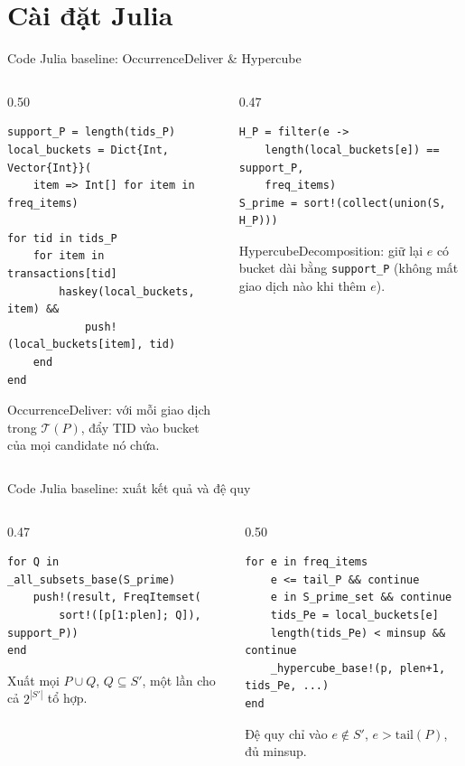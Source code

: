 \documentclass[9pt, aspectratio=169]{beamer}
\begin{document}
\section{Cài đặt Julia}

\begin{frame}[fragile]{Code Julia baseline: OccurrenceDeliver \& Hypercube}
  \begin{columns}[T,onlytextwidth]
    \begin{column}{0.50\textwidth}
\begin{lstlisting}
support_P = length(tids_P)
local_buckets = Dict{Int, Vector{Int}}(
    item => Int[] for item in freq_items)

for tid in tids_P
    for item in transactions[tid]
        haskey(local_buckets, item) &&
            push!(local_buckets[item], tid)
    end
end
\end{lstlisting}
      \small OccurrenceDeliver: với mỗi giao dịch trong $\mathcal T(P)$, đẩy
      TID vào bucket của mọi candidate nó chứa.
    \end{column}
    \begin{column}{0.47\textwidth}
\begin{lstlisting}
H_P = filter(e ->
    length(local_buckets[e]) == support_P,
    freq_items)
S_prime = sort!(collect(union(S, H_P)))
\end{lstlisting}
      \small HypercubeDecomposition: giữ lại $e$ có bucket dài bằng
      \texttt{support\_P} (không mất giao dịch nào khi thêm $e$).
    \end{column}
  \end{columns}
\end{frame}

\begin{frame}[fragile]{Code Julia baseline: xuất kết quả và đệ quy}
  \begin{columns}[T,onlytextwidth]
    \begin{column}{0.47\textwidth}
\begin{lstlisting}
for Q in _all_subsets_base(S_prime)
    push!(result, FreqItemset(
        sort!([p[1:plen]; Q]), support_P))
end
\end{lstlisting}
      \small Xuất mọi $P\cup Q$, $Q\subseteq S'$, một lần cho cả $2^{|S'|}$
      tổ hợp.
    \end{column}
    \begin{column}{0.50\textwidth}
\begin{lstlisting}
for e in freq_items
    e <= tail_P && continue
    e in S_prime_set && continue
    tids_Pe = local_buckets[e]
    length(tids_Pe) < minsup && continue
    _hypercube_base!(p, plen+1, tids_Pe, ...)
end
\end{lstlisting}
      \small Đệ quy chỉ vào $e\notin S'$, $e>\mathrm{tail}(P)$, đủ minsup.
    \end{column}
  \end{columns}
\end{frame}
\end{document}
